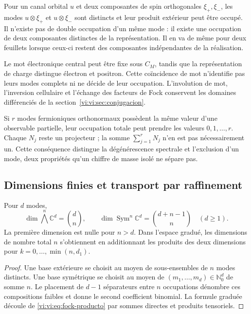 Pour un canal orbital \(u\) et deux composantes de spin
orthogonales \(\xi_+,\xi_-\), les modes
\(u\otimes\xi_+\) et \(u\otimes\xi_-\) sont distincts et leur
produit extérieur peut être occupé. Il n’existe pas de double occupation
d’un même mode : il existe une occupation de deux composantes distinctes
de la représentation. Il en va de même pour deux feuillets lorsque ceux-ci
restent des composantes indépendantes de la réalisation.

Le mot électronique central peut être fixe sous \(C_M\), tandis que
la représentation de charge distingue électron et positron. Cette
coïncidence de mot n’identifie pas leurs modes complets ni
ne décide de leur occupation. L’involution de mot, l’inversion
cellulaire et l’échange des facteurs de Fock conservent les
domaines différenciés de la section~\ref{vi:vi:sec:conjugacion}.

Si \(r\) modes fermioniques orthonormaux possèdent la même valeur
d’une observable partielle, leur occupation totale peut prendre les valeurs
\(0,1,\ldots,r\). Chaque \(N_j\) reste un projecteur ;
la somme \(\sum_{j=1}^rN_j\) n’en est pas nécessairement un. Cette
conséquence distingue la dégénérescence spectrale et l’exclusion d’un
mode, deux propriétés qu’un chiffre de masse isolé ne sépare pas.

\subsection{Dimensions finies et transport par raffinement}
\label{vi:vi:subsec:fock-refinamiento}

\begin{proposition}
\label{vi:vi:prop:censo-fock}
Pour \(d\) modes,
\[
 \dim\bigwedge^n\mathbb C^d=\binom dn,
 \qquad
 \dim\operatorname{Sym}^n\mathbb C^d=\binom{d+n-1}{n}
 \quad(d\ge1).
\]
La première dimension est nulle pour \(n>d\). Dans l’espace
gradué, les dimensions de nombre total \(n\) s’obtiennent
en additionnant les produits des deux dimensions pour
\(k=0,\ldots,\min(n,d_1)\).
\end{proposition}
\begin{proof}
Une base extérieure se choisit au moyen de sous-ensembles de \(n\) modes
distincts. Une base symétrique se choisit au moyen de
\((m_1,\ldots,m_d)\in\mathbb N_0^d\) de somme \(n\).
Le placement de \(d-1\) séparateurs entre \(n\) occupations
dénombre ces compositions faibles et donne le second coefficient binomial.
La formule graduée découle de \eqref{vi:vi:eq:fock-producto} par
sommes directes et produits tensoriels.
\end{proof}

